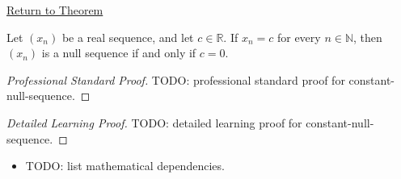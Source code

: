 \newpage
{}
\label{prf:constant-null-sequence}

\begin{remark*}[Return]
\hyperref[thm:constant-null-sequence]{Return to Theorem}
\end{remark*}

\begin{theorem*}
Let $(x_n)$ be a real sequence, and let $c \in \mathbb{R}$. If $x_n = c$
for every $n \in \mathbb{N}$, then $(x_n)$ is a null sequence if and only if
$c = 0$.

\smallskip
\noindent
\end{theorem*}

\begin{proof}[Professional Standard Proof]
\LRAProofBodyStart
TODO: professional standard proof for constant-null-sequence.
\end{proof}

\begin{proof}[Detailed Learning Proof]
\LRAProofBodyStart
TODO: detailed learning proof for constant-null-sequence.
\end{proof}

\begin{remark*}
\end{remark*}

\begin{dependencies}
\begin{itemize}
  \item TODO: list mathematical dependencies.
\end{itemize}
\end{dependencies}

\clearpage
